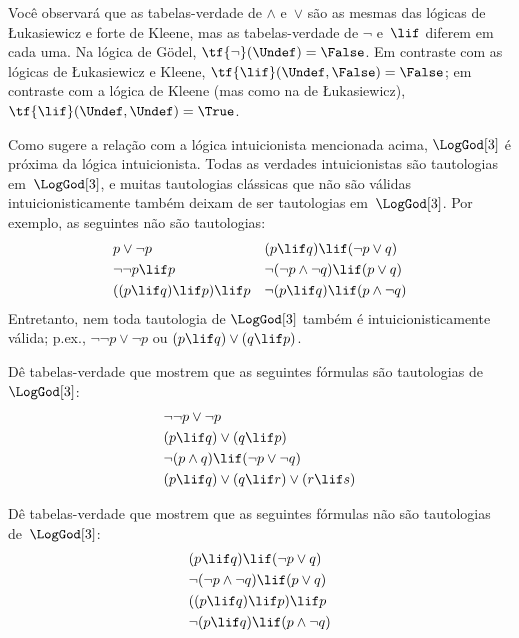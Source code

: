 \documentclass[../../../include/open-logic-section]{subfiles}
\begin{document}
Você observará que as tabelas-verdade de $\land$ e~$\lor$ são as
mesmas das lógicas de \L ukasiewicz e forte de Kleene, mas as tabelas-verdade
de $\lnot$ e~$\lif$ diferem em cada uma. Na lógica de G\"odel,
$\tf{\lnot}(\Undef) = \False$. Em contraste com as lógicas de \L ukasiewicz e
Kleene, $\tf{\lif}(\Undef, \False) = \False$; em contraste com a
lógica de Kleene (mas como na de \L ukasiewicz), $\tf{\lif}(\Undef,
\Undef) = \True$.

Como sugere a relação com a lógica intuicionista mencionada acima,
$\LogGod[3]$ é próxima da lógica intuicionista. Todas as verdades intuicionistas
são tautologias em~$\LogGod[3]$, e muitas tautologias clássicas
que não são válidas intuicionisticamente também deixam de ser tautologias
em~$\LogGod[3]$. Por exemplo, as seguintes não são tautologias:
\begin{align*}
  & p \lor \lnot p && (p \lif q) \lif (\lnot p \lor q) \\
  & \lnot\lnot p \lif p && \lnot(\lnot p \land \lnot q) \lif (p \lor q) \\
  & ((p \lif q) \lif p) \lif p && \lnot(p \lif q) \lif (p \land \lnot q)
\end{align*}
Entretanto, nem toda tautologia de $\LogGod[3]$ também é
intuicionisticamente válida; p.ex., $\lnot\lnot p \lor \lnot p$ ou $(p
\lif q) \lor (q \lif p)$.

\begin{prob}
  Dê tabelas-verdade que mostrem que as seguintes fórmulas são tautologias
  de~$\LogGod[3]$:
  \begin{align*}
    & \lnot\lnot p \lor \lnot p\\
    & (p \lif q) \lor (q \lif p) \\
    & \lnot(p \land q) \lif (\lnot p \lor \lnot q) \\
    & (p \lif q) \lor (q \lif r) \lor (r \lif s)
  \end{align*}
\end{prob}

\begin{prob}
  Dê tabelas-verdade que mostrem que as seguintes fórmulas não são tautologias
  de~$\LogGod[3]$:
  \begin{align*}
    & (p \lif q) \lif (\lnot p \lor q) \\
    & \lnot(\lnot p \land \lnot q) \lif (p \lor q) \\
    & ((p \lif q) \lif p) \lif p \\
    & \lnot(p \lif q) \lif (p \land \lnot q)
  \end{align*}
\end{prob}
\end{document}
